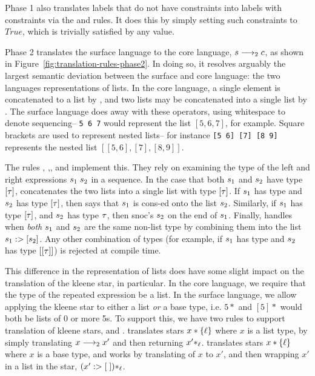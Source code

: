 Phase 1 also translates
labels that do not have constraints into
labels with constraints
via the \AssignmentNoPredTrans and \DotNoPredTrans rules.
It does this by simply setting such constraints to $True$,
which is trivially satisfied by any value.


Phase 2 translates the surface language to the core language,
$s \longrightarrow_2 c$,
as shown in Figure~\ref{fig:translation-rules-phase2}.
In doing so,
it resolves arguably the largest semantic deviation between the surface and core language:
the two languages representations of lists.
In the core language, a single element is concatenated to a list
by \cons, and two lists may be concatenated into a single list by \concat.
The surface language does away with these operators,
using whitespace to denote sequencing--
\texttt{5 6 7} would represent the list $[5, 6, 7]$, for example.
Square brackets are used to represent nested lists--
for instance \texttt{[5 6] [7] [8 9]} represents the nested list $[[5, 6], [7], [8, 9]]$.

The rules \ConcatBaseTrans, \ConcatConsTrans,\ConcatSnocTrans, and \ConcatTrans implement this.
They rely on examining the type of the left and right expressions $s_1\;s_2$ in a sequence.
In the case that both $s_1$ and $s_2$
have type $[\tau]$,
\ConcatTrans concatenates the two lists into a single list with type $[\tau]$.
If $s_1$ has type \type and $s_2$ has type $[\tau]$,
then  \ConcatConsTrans says that $s_1$ is cons-ed onto the list $s_2$.
Similarly, if $s_1$ has type $[\tau]$,
and $s_2$ has type $\tau$,
then \ConcatSnocTrans snoc's $s_2$ on the end of $s_1$.
Finally, \ConcatBaseTrans
handles when \textit{both} $s_1$ and $s_2$ are the same non-list type \base
by combining them into the list $s_1 :> [s_2]$.
Any other combination of types
(for example, if $s_1$ has type \type and $s_2$
has type $[[\tau]]$) is rejected at compile time.

This difference in the representation of lists does have some slight impact 
on the translation of the kleene star, in particular.
In the core language, we require that the type of the repeated
expression be a list.
In the surface language,
we allow applying the kleene star to either a list \textit{or} a base type,
i.e. $5*$ and $[5]*$ would both be lists of 0 or more 5s.
To support this, we have two rules to support translation of
kleene stars,
\StarTrans and \StarBaseTrans.
\StarTrans translates stars $x*\{\ell\}$ where $x$ is a list type,
by simply translating $x \longrightarrow_2 x'$ and then returning $x'*_{\ell}$.
\StarBaseTrans translates stars $x*\{\ell\}$ where $x$ is a base type,
and works by translating of $x$ to $x'$, and then wrapping $x'$ in a list in the star,
$(x' :> [\;])*_{\ell}$.

